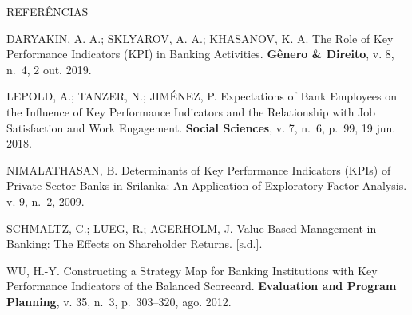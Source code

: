 \documentclass[
  ignorenonframetext,
]{beamer}
\begin{document}
\begin{frame}{REFERÊNCIAS}
\protect\hypertarget{referuxeancias}{}
\footnotesize

DARYAKIN, A. A.; SKLYAROV, A. A.; KHASANOV, K. A. The Role of Key
Performance Indicators (KPI) in Banking Activities. \textbf{Gênero \&
Direito}, v. 8, n.~4, 2 out. 2019.

LEPOLD, A.; TANZER, N.; JIMÉNEZ, P. Expectations of Bank Employees on
the Influence of Key Performance Indicators and the Relationship with
Job Satisfaction and Work Engagement. \textbf{Social Sciences}, v. 7,
n.~6, p.~99, 19 jun. 2018.

NIMALATHASAN, B. Determinants of Key Performance Indicators (KPIs) of
Private Sector Banks in Srilanka: An Application of Exploratory Factor
Analysis. v. 9, n.~2, 2009.

SCHMALTZ, C.; LUEG, R.; AGERHOLM, J. Value-Based Management in Banking:
The Effects on Shareholder Returns. {[}s.d.{]}.

WU, H.-Y. Constructing a Strategy Map for Banking Institutions with Key
Performance Indicators of the Balanced Scorecard. \textbf{Evaluation and
Program Planning}, v. 35, n.~3, p.~303--320, ago. 2012.
\end{frame}
\end{document}
